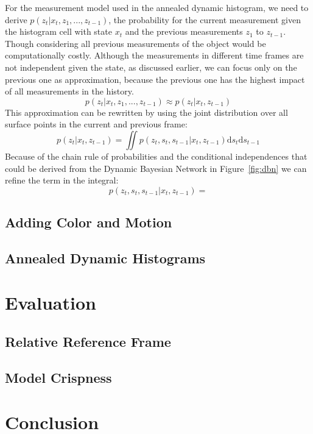 \documentclass[twoside,a4paper,article]{combine}
\begin{document}
For the measurement model used in the annealed dynamic histogram, we
need to derive $p(z_t|x_t,z_1,...,z_{t-1})$, the probability for the
current measurement given the histogram cell with state $x_t$ and the
previous measurements $z_1$ to $z_{t-1}$. Though considering all
previous measurements of the object would be computationally
costly. Although the measurements in different time frames are not
independent given the state, as discussed earlier, we can focus only
on the previous one as approximation, because the previous one has the
highest impact of all measurements in the history.
\begin{equation}
p(z_t|x_t,z_1,...,z_{t-1}) \approx p(z_t|x_t,z_{t-1})
\end{equation}
This approximation can be rewritten by using the joint distribution over
all surface points in the current and previous frame:
\begin{equation}
p(z_t|x_t,z_{t-1}) = \iint p(z_t,s_t,s_{t-1}|x_t,z_{t-1}) \mathrm d
s_t \mathrm d s_{t-1}
\end{equation}
Because of the chain rule of probabilities and the conditional
independences that could be derived from the Dynamic Bayesian Network
in Figure~\ref{fig:dbn} we can refine the term in the integral:
\begin{equation}
p(z_t,s_t,s_{t-1}|x_t,z_{t-1}) = 
\end{equation}




\subsection{Adding Color and Motion}
\label{sub:adding-color}
\subsection{Annealed Dynamic Histograms}
\label{sub:adh}

\section{Evaluation}
\label{sec:evaluation}
\subsection{Relative Reference Frame}
\label{sub:relative-ref-frame}
\subsection{Model Crispness}
\label{sub:model-crispness}

\section{Conclusion}
\label{sec:conclusion}





\end{document}
